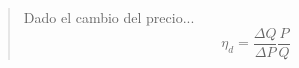 {\color{blue}
{\bfseries\begin{quote}

Dado el cambio del precio...
\begin{equation*}
    \eta _d = \frac{\Delta Q}{\Delta P} \frac{P}{Q}
\end{equation*}

\end{quote}
} %
{\space\quad}\par
}
